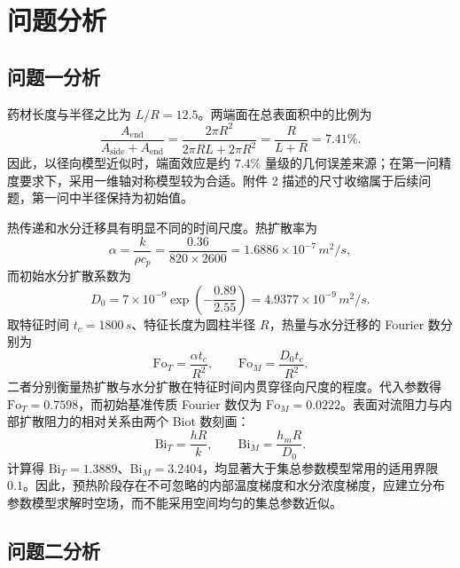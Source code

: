 \documentclass[withoutpreface,bwprint]{cumcmthesis}
\begin{document}
\section{问题分析}

\subsection{问题一分析}

药材长度与半径之比为 $L/R=12.5$。两端面在总表面积中的比例为
\begin{equation}
\frac{A_{\mathrm{end}}}{A_{\mathrm{side}}+A_{\mathrm{end}}}
=\frac{2\pi R^2}{2\pi RL+2\pi R^2}
=\frac{R}{L+R}=7.41\% .
\label{eq:end_ratio}
\end{equation}
因此，以径向模型近似时，端面效应是约 $7.4\%$ 量级的几何误差来源；在第一问精度要求下，采用一维轴对称模型较为合适。附件 2 描述的尺寸收缩属于后续问题，第一问中半径保持为初始值。

热传递和水分迁移具有明显不同的时间尺度。热扩散率为
\begin{equation}
\alpha=\frac{k}{\rho c_p}
=\frac{0.36}{820\times2600}
=1.6886\times10^{-7}\,\si{m^2/s},
\label{eq:alpha}
\end{equation}
而初始水分扩散系数为
\begin{equation}
D_0=7\times10^{-9}\exp\left(-\frac{0.89}{2.55}\right)
=4.9377\times10^{-9}\,\si{m^2/s}.
\label{eq:d0}
\end{equation}
取特征时间 $t_c=1800\,\si{s}$、特征长度为圆柱半径 $R$，热量与水分迁移的 Fourier 数分别为
\begin{equation}
\mathrm{Fo}_T=\frac{\alpha t_c}{R^2},\qquad
\mathrm{Fo}_M=\frac{D_0t_c}{R^2}.
\label{eq:p1_fourier_numbers}
\end{equation}
二者分别衡量热扩散与水分扩散在特征时间内贯穿径向尺度的程度。代入参数得 $\mathrm{Fo}_T=0.7598$，而初始基准传质 Fourier 数仅为 $\mathrm{Fo}_M=0.0222$。表面对流阻力与内部扩散阻力的相对关系由两个 Biot 数刻画：
\begin{equation}
\mathrm{Bi}_T=\frac{hR}{k},\qquad
\mathrm{Bi}_M=\frac{h_mR}{D_0}.
\label{eq:p1_biot_numbers}
\end{equation}
计算得 $\mathrm{Bi}_T=1.3889$、$\mathrm{Bi}_M=3.2404$，均显著大于集总参数模型常用的适用界限 $0.1$。因此，预热阶段存在不可忽略的内部温度梯度和水分浓度梯度，应建立分布参数模型求解时空场，而不能采用空间均匀的集总参数近似。

\subsection{问题二分析}
\end{document}
